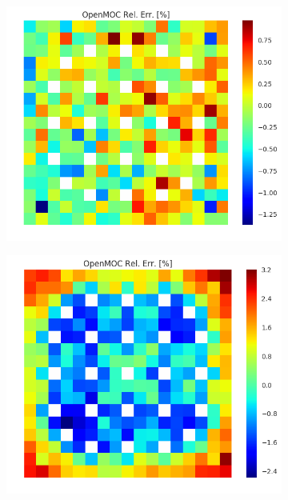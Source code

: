 \begin{figure}[h!]
\begin{subfigure}{.33\textwidth}
  \caption{}
  \label{fig:chap8-assm-1.6-inf-fiss-8}
\end{subfigure}%
\begin{subfigure}{.33\textwidth}
  \centering
  \includegraphics[width=\linewidth]{figures/quantification/assm-16/infinite-fiss-err-70}
  \caption{}
  \label{fig:chap8-assm-1.6-inf-fiss-70}
\end{subfigure}
\begin{subfigure}{.33\textwidth}
  \centering
  \includegraphics[width=\linewidth]{figures/quantification/assm-16/null-fiss-err-2}

\end{subfigure}
\end{figure}
